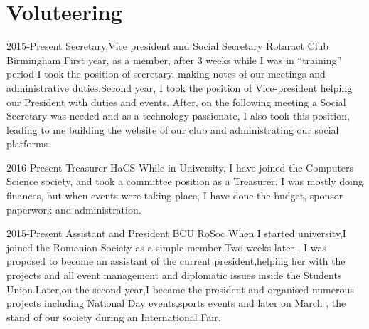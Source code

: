 \documentclass[]{friggeri-cv}
\begin{document}
\section{Voluteering}
\begin{entrylist}

    \entry
    {2015-Present}
    {Secretary,Vice president and Social Secretary}
    {Rotaract Club Birmingham}
    {First year, as a member, after 3 weeks while I was in “training” period I took the position of secretary, making notes of our meetings and administrative duties.Second year, I took the position of Vice-president helping our President with duties and events. After, on the following meeting a Social Secretary was needed and as a technology passionate, I also took this position, leading to me building the website of our club and administrating our social platforms.}
    ~
    
    \entry
    {2016-Present}
    {Treasurer}
    {HaCS}
    {While in University, I have joined the Computers Science society, and took a committee position as a Treasurer. I was mostly doing finances, but when events were taking place, I have done the budget, sponsor paperwork and administration.}
    ~ 
    
    \entry
    {2015-Present}
    {Assistant and President}
    {BCU RoSoc}
    {When I started university,I joined the Romanian Society as a simple member.Two weeks later , I was proposed to become an assistant of the current president,helping her with the projects and all event management and diplomatic issues inside the Students Union.Later,on the second year,I became the president and organised numerous projects including National Day events,sports events and later on March , the stand of our society during an International Fair.}
    
\end{entrylist}
    
\end{document}
